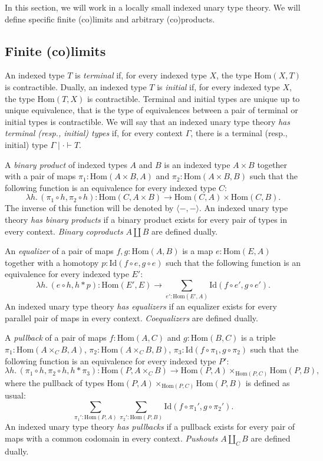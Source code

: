 \documentclass[reqno]{amsart}
\theoremstyle{definition}
\theoremstyle{remark}
\newcommand{\ob}{}
\newcommand{\fs}[1]{\mathrm{#1}}
\newcommand{\Hom}{\fs{Hom}}
\newcommand{\Id}{\fs{Id}}
\numberwithin{figure}{section}
\begin{document}
In this section, we will work in a locally small indexed unary type theory.
We will define specific finite (co)limits and arbitrary (co)products.

\subsection{Finite (co)limits}

An indexed type $T$ is \emph{terminal} if, for every indexed type $X$, the type $\Hom(X,T)$ is contractible.
Dually, an indexed type $T$ is \emph{initial} if, for every indexed type $X$, the type $\Hom(T,X)$ is contractible.
Terminal and initial types are unique up to unique equivalence, that is the type of equivalences between a pair of terminal or initial types is contractible.
We will say that an indexed unary type theory \emph{has terminal (resp., initial) types} if, for every context $\Gamma$, there is a terminal (resp., initial) type $\Gamma \mid \cdot \vdash T \ob$.

A \emph{binary product} of indexed types $A$ and $B$ is an indexed type $A \times B$ together with a pair of maps $\pi_1 : \Hom(A \times B, A)$ and $\pi_2 : \Hom(A \times B, B)$
such that the following function is an equivalence for every indexed type $C$:
\[ \lambda h.\,(\pi_1 \circ h, \pi_2 \circ h) : \Hom(C, A \times B) \to \Hom(C,A) \times \Hom(C,B). \]
The inverse of this function will be denoted by $\langle -, - \rangle$.
An indexed unary type theory \emph{has binary products} if a binary product exists for every pair of types in every context.
\emph{Binary coproducts} $A \amalg B$ are defined dually.

An \emph{equalizer} of a pair of maps $f,g : \Hom(A,B)$ is a map $e : \Hom(E,A)$ together with a homotopy $p : \Id(f \circ e, g \circ e)$
such that the following function is an equivalence for every indexed type $E'$:
\[ \lambda h.\,(e \circ h, h * p) : \Hom(E', E) \to \sum_{e' : \Hom(E',A)} \Id(f \circ e', g \circ e'). \]
An indexed unary type theory \emph{has equalizers} if an equalizer exists for every parallel pair of maps in every context.
\emph{Coequalizers} are defined dually.

A \emph{pullback} of a pair of maps $f : \Hom(A,C)$ and $g : \Hom(B,C)$ is a triple $\pi_1 : \Hom(A \times_C B, A)$, $\pi_2 : \Hom(A \times_C B, B)$, $\pi_3 : \Id(f \circ \pi_1, g \circ \pi_2)$
such that the following function is an equivalence for every indexed type $P'$:
\[ \lambda h.\,(\pi_1 \circ h, \pi_2 \circ h, h * \pi_3) : \Hom(P, A \times_C B) \to \Hom(P,A) \times_{\Hom(P,C)} \Hom(P,B), \]
where the pullback of types $\Hom(P,A) \times_{\Hom(P,C)} \Hom(P,B)$ is defined as usual:
\[ \sum_{\pi_1' : \Hom(P,A)} \sum_{\pi_2' : \Hom(P,B)} \Id(f \circ \pi_1', g \circ \pi_2'). \]
An indexed unary type theory \emph{has pullbacks} if a pullback exists for every pair of maps with a common codomain in every context.
\emph{Pushouts} $A \amalg_C B$ are defined dually.
\end{document}
